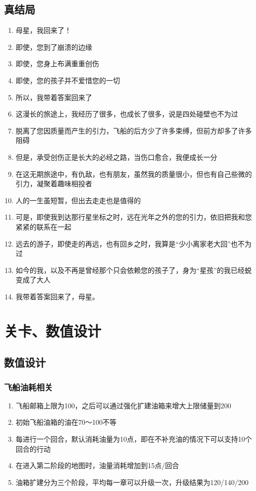 \documentclass{ctexart}
\begin{document}
		\subsection{真结局}
			\begin{enumerate}
				\item 母星，我回来了！
				\item 即使，您到了崩溃的边缘
				\item 即使，您身上布满重重创伤
				\item 即使，您的孩子并不爱惜您的一切
				\item 所以，我带着答案回来了
				\item 这漫长的旅途上，我经历了很多，也成长了很多，说是四处碰壁也不为过
				\item 脱离了您因质量而产生的引力，飞船的后方少了许多束缚，但前方却多了许多阻碍
				\item 但是，承受创伤正是长大的必经之路，当伤口愈合，我便成长一分
				\item 在这无期旅途中，有仇敌，也有朋友，虽然我的质量很小，但也有自己些微的引力，凝聚着趣味相投者
				\item 人的一生虽短暂，但出去走走也是值得的
				\item 可是，即使我到达那行星坐标之时，远在光年之外的您的引力，依旧把我和您紧紧的联系在一起
				\item 远去的游子，即使走的再远，也有回乡之时，我算是“少小离家老大回”也不为过
				\item 如今的我，以及不再是曾经那个只会依赖您的孩子了，身为“星孩”的我已经蜕变成了大人
				\item 我带着答案回来了，母星。
			\end{enumerate}
	\section{关卡、数值设计}
		\subsection{数值设计}
		\subsubsection{飞船油耗相关}
		\begin{enumerate}
			\item 飞船邮箱上限为100，之后可以通过强化扩建油箱来增大上限储量到200
			\item 初始飞船油箱的油在70～100不等
			\item 每进行一个回合，默认消耗油量为10点，即在不补充油的情况下可以支持10个回合的行动
			\item 在进入第二阶段的地图时，油量消耗增加到15点/回合
			\item 油箱扩建分为三个阶段，平均每一章可以升级一次，升级结果为120/140/200
		\end{enumerate}
\end{document}
